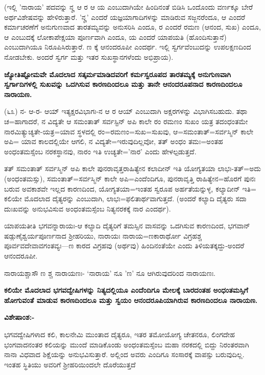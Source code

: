 (ಇಲ್ಲಿ 'ನಾರಾಯ' ಪದವನ್ನು ನೄ ಆ ರ ಆ ಯ ಎಂಬುದಾಗಿಯೇ ಹಿಂದಿನಂತೆ ಬಿಡಿಸಿ ಒಂದೊಂದು ವರ್ಣಕ್ಕೂ ಬೇರೆ ಅರ್ಥವಿಶೇಷವನ್ನು ಹೇಳಿರುತ್ತಾರೆ. 'ನೄ' ಎಂದರೆ ಯಜ್ಞಯಾಗಾದಿಗಳನ್ನು ಮಾಡಿರುವ ಸಜ್ಜನರೆಂದೂ, ಆ ಎಂದರೆ ಕರ್ಮಾಚರಣೆಗೆ ಅನುಗುಣವಾದ ತಾರತಮ್ಯವನ್ನು ಅನುಸರಿಸಿ ಎಂದೂ, ರ ಎಂದರೆ ರಮಣ (ಆನಂದ, ಸುಖ) ಎಂದೂ, ಆ ಎಂಬುದಕ್ಕೆ ಲೋಕಾಪೇಕ್ಷಯಾ ಪೂರ್ಣವಾಗಿ ಎಂದೂ, ಯ ಎಂದರೆ ಯಾಪಯತಿ (ಹೊಂದಿಸುತ್ತಾನೆ) ಎಂಬುದಾಗಿಯೂ ನಿರೂಪಿಸಿರುತ್ತಾರೆ. ಣ ಕ್ಕೆ ಆನಂದರೂಪೀ ಎಂದರ್ಥ. ಇಲ್ಲಿ ಸ್ವರ್ಗವೆಂಬುದನ್ನು ಉಪಲಕ್ಷಣದಿಂದ ನೋಡಬೇಕು. ಅಂದರೆ ಸ್ವರ್ಗ ಮತ್ತು ಇತರ ಸುಖಸ್ಥಾನಗಳೆಂದು ಅಭಿಪ್ರಾಯ).

\begin{center}
\textbf{ಜ್ಯೋತಿಷ್ಟೋಮವೇ ಮೊದಲಾದ ಸತ್ಕರ್ಮಮಾಡಿದವರಿಗೆ ಕರ್ಮಸ್ವರೂಪದ ತಾರತಮ್ಯಕ್ಕೆ ಅನುಗುಣವಾಗಿ ಸ್ವರ್ಗಾದಿಗಳಲ್ಲಿ ಸುಖವನ್ನು ಒದಗಿಸುವ ಕಾರಣದಿಂದಲೂ ಮತ್ತು ತಾನೇ ಆನಂದರೂಪನಾದ ಕಾರಣದಿಂದಲೂ ನಾರಾಯಣ.}
\end{center}

(೬೩) ನ- ಆ-ರ- ಆಯ್ ಇತ್ಯಕ್ಷರವಿಭಾಗಃ-ನ ಆ ರ ಆಯ್ ಎಂಬುದಾಗಿ ಅಕ್ಷರಗಳನ್ನು ವಿಭಾಗಿಸಬಹುದು. ತಥಾ ಚ=ಹಾಗಾದರೆ, ನ ವಿದ್ಯತೇ ಆ ಸಮಂತಾತ್ ಸರ್ವಸ್ಟಿನ್ ಅಪಿ ಕಾಲೇ ರಂ ರಮಣಂ ಸುಖಂ ಯತ್ರ ತದಂಧಂತಮೇ ನಾರಮಿತ್ಯುಚ್ಯತೇ-ಯತ್ರ=ಯಾವ ಸ್ಥಳದಲ್ಲಿ ರಂ=ರಮಣಂ=ಸುಖ=ಸುಖವು, ಆ=ಸಮಂತಾತ್=ಸರ್ವಸ್ಮಿನ್ ಕಾಲೇ ಅಪಿ= ಯಾವ ಕಾಲದಲ್ಲಿಯೇ ಆಗಲಿ, ನ ವಿದ್ಯತೇ=ಇರುವುದಿಲ್ಲವೋ, ತತ್ ಅಂಧಂ ತಮಃ=ಅಂತಹ ಅಂಧಂತಮಸ್ಸೆಂಬ ನರಕಸ್ಥಾನವು, ನಾರಂ ಇತಿ ಉಚ್ಯತೇ='ನಾರ' ಎಂದು ಹೇಳಲ್ಪಡುತ್ತದೆ.

ತತ್ ಸಮಂತಾತ್ ಸರ್ವಸ್ಮಿನ್ ಅಪಿ ಕಾಲೇ ಪುನರಾವೃತ್ತರಾಹಿತ್ಯೇನ ಕಲಾದೀನ್ ಇತಿ ಯೋಗ್ಯತಯಾ ಲಾಭಃ-ತತ್=ಅದು (ಅಂಧಂತಮಸ್ಸು), ಸಮಂತಾತ್=ಸರ್ವಸ್ಮಿನ್ ಕಾಲೇ ಅಪಿ=ಎಂದೆಂದಿಗೂ, ಪುನರಾವೃತ್ತಿ ರಾಹಿತ್ಯೇನ=ಹೊರಗೆ ಪುನಃ ಬರುವ ಅವಕಾಶವೇ ಇಲ್ಲದ ಕಾರಣದಿಂದ, ಯೋಗ್ಯತಯಾ=ಇಂತಹ ಸ್ವರೂಪ ಅರ್ಹತೆಯನ್ನುಳ್ಳ, ಕಲ್ಯಾದೀನ್ ಇತಿ= ಕಲಿಯೇ ಮೊದಲಾದ ದೈತ್ಯರನ್ನು ಎಂಬುದಾಗಿ, ಲಾಭಃ=ಫಲಿತಾರ್ಥವಾಗುತ್ತದೆ. (ಅಂದರೆ ಕಲ್ಯಾದಿ ದೈತ್ಯರು ಸದಾ ದುಃಖವನ್ನು ಅನುಭವಿಸುವ ಅಂಧಂತಮಸ್ಸೆಂಬ ನಿತ್ಯನರಕಕ್ಕೆ ನಾರ ಎಂದರ್ಥ).

ಯಾಪಯತೀತಿ ಭಗವನ್ನಾರಾಯಃ-ಆ ಕಲ್ಯಾದಿ ದೈತ್ಯರಿಗೆ ತಮಸ್ಸಿನ ವಾಸವನ್ನು ಒದಗಿಸುವ ಕಾರಣದಿಂದ, ಭಗವಾನ್ ಷಡ್ಗುಣೈಶ್ವರ್ಯಪೂರ್ಣನಾದ ಶ‍್ರೀಹರಿಯು, ನಾರಾಯಃ ನಾರಾಯ=ಣಕಾರಾರ್ಥೋ ವಿಗ್ರಹಶ್ಚ ಪೂರ್ವವದೇವಾವಗಂತವ್ಯಃ—ಣ ಕಾರದ ವಿಗ್ರಹವು (ಅರ್ಥವು) ಹಿಂದಿನಂತೆಯೇ ಎಂದು ತಿಳಿಯತಕ್ಕದ್ದು-ಅಂದರೆ ಆನಂದರೂಪೀ.

ನಾರಾಯಶ್ಚಾಸೌ ಣ ಶ್ಚ ನಾರಾಯಣಃ- `ನಾರಾಯ' ನೂ 'ಣ' ನೂ ಆಗಿರುವುದರಿಂದ ನಾರಾಯಣಃ.

\begin{center}
\textbf{ಕಲಿಯೇ ಮೊದಲಾದ ಭಗವದ್ವೇಷಿಗಳನ್ನು ನಿತ್ಯದಲ್ಲಿಯೂ ಎಂದೆಂದಿಗೂ ಮೇಲಕ್ಕೆ ಬಾರದಂತಹ ಅಂಧಂತಮಸ್ಸಿಗೆ ಹೋಗುವಂತೆ ಮಾಡುವ ಕಾರಣದಿಂದಲೂ ಮತ್ತು ಸ್ವಯಂ ಆನಂದರೂಪಿಯಾಗಿರುವ ಕಾರಣದಿಂದಲೂ ನಾರಾಯಣ.}
\end{center}

\noindent
\textbf{ವಿಶೇಷಾಂಶ:-}

ಭಗವದ್ವೇಷಿಗಳಾದ ಕಲಿ, ಕಾಲನೇಮಿ ಮುಂತಾದ ದೈತ್ಯರೂ, ಇತರ ತಮೋಯೋಗ್ಯ ಚೇತನರೂ, ಲಿಂಗದೇಹ ಭಂಗವಾದನಂತರ ಕಲಿಯನ್ನು ಮುಂದೆ ಮಾಡಿಕೊಂಡು ಅಂಧಂತಮಸ್ಸೆಂಬ ಮಹಾ ನರಕದಲ್ಲಿ ಬಿದ್ದು ನಿರಂತರವಾಗಿ ನಾನಾ ವಿಧವಾದ ಶಿಕ್ಷೆಯನ್ನು ಅನುಭವಿಸುತ್ತಾರೆ. ಅಲ್ಲಿಂದ ಅವರು ಎಂದಿಗೂ ಸಂಸಾರಕ್ಕೆ ವಾಪಸ್ಸು ಬರುವುದಿಲ್ಲ. ಇಂತಹ ಸ್ಥಿತಿಯು ಅವರಿಗೆ ಶ‍್ರೀಹರಿಯಿಂದಲೇ ದೊರೆಯುತ್ತದೆ

